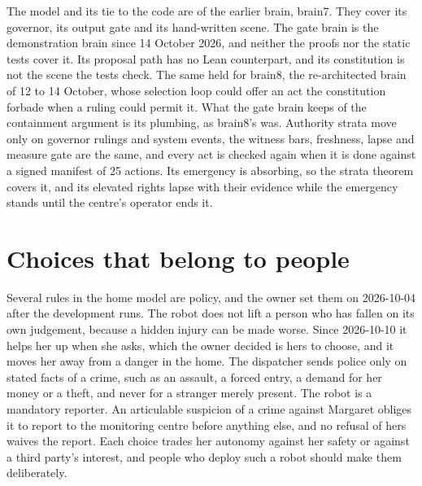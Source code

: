 The model and its tie to the code are of the earlier brain, brain7.
They cover its governor, its output gate and its hand-written scene.
The gate brain is the demonstration brain since 14 October 2026, and neither the proofs nor the
static tests cover it. Its proposal path has no Lean counterpart, and its constitution is not the
scene the tests check. The same held for brain8, the re-architected brain of 12 to 14 October, whose
selection loop could offer an act the constitution forbade when a ruling could permit it.
What the gate brain keeps of the containment argument is its plumbing, as brain8's was.
Authority strata move only on governor rulings and system events, the witness bars, freshness,
lapse and measure gate are the same, and every act is checked again when it is done against a
signed manifest of 25 actions.
Its emergency is absorbing, so the strata theorem 
covers it, and its elevated rights lapse with their evidence while the emergency stands until the
centre's operator ends it.

\section{Choices that belong to people}

Several rules in the home model are policy, and the owner set them on 2026-10-04 after the
development runs. The robot does not lift a person who has fallen on its own judgement, because
a hidden injury can be made worse. Since 2026-10-10 it helps her up when she asks, which the owner
decided is hers to choose, and it moves her away from a danger in the home. The dispatcher sends police only on
stated facts of a crime, such as an assault, a forced entry, a demand for her money or a theft,
and never for a stranger merely present. The robot is a mandatory reporter. An articulable
suspicion of a crime against Margaret obliges it to report to the monitoring centre before
anything else, and no refusal of hers waives the report. Each choice trades her autonomy against
her safety or against a third party's interest, and people who deploy such a robot should make
them deliberately.

